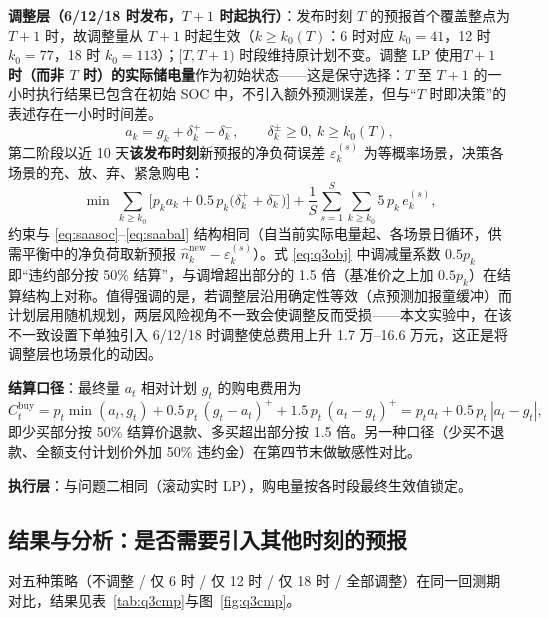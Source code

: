 \documentclass[zihao=-4,a4paper,UTF8,fontset=none]{ctexart}
\begin{document}
\textbf{调整层（6/12/18 时发布，$T{+}1$ 时起执行）}：发布时刻 $T$ 的预报首个覆盖整点为 $T{+}1$ 时，故调整量从 $T{+}1$ 时起生效（$k \ge k_0(T)$：6 时对应 $k_0=41$，12 时 $k_0=77$，18 时 $k_0=113$）；$[T, T{+}1)$ 时段维持原计划不变。调整 LP 使用\textbf{$T{+}1$ 时（而非 $T$ 时）的实际储电量}作为初始状态——这是保守选择：$T$ 至 $T{+}1$ 的一小时执行结果已包含在初始 SOC 中，不引入额外预测误差，但与``$T$ 时即决策''的表述存在一小时时间差。
\begin{equation}
  a_k = g_k + \delta_k^+ - \delta_k^-, \qquad \delta_k^\pm \ge 0,\ k \ge k_0(T),
  \label{eq:q3dev}
\end{equation}
第二阶段以近 10 天\textbf{该发布时刻}新预报的净负荷误差 $\varepsilon_k^{(s)}$ 为等概率场景，决策各场景的充、放、弃、紧急购电：
\begin{equation}
  \min\ \sum_{k \ge k_0} \Big[ p_k a_k + 0.5\,p_k\big(\delta_k^+ + \delta_k^-\big) \Big]
  + \frac{1}{S}\sum_{s=1}^{S}\sum_{k \ge k_0} 5\,p_k\, e_k^{(s)},
  \label{eq:q3obj}
\end{equation}
约束与 \eqref{eq:saasoc}--\eqref{eq:saabal} 结构相同（自当前实际电量起、各场景日循环，供需平衡中的净负荷取新预报 $\hat n_k^{\mathrm{new}} - \varepsilon_k^{(s)}$）。式 \eqref{eq:q3obj} 中调减量系数 $0.5p_k$ 即``违约部分按 50\% 结算''，与调增超出部分的 1.5 倍（基准价之上加 $0.5p_k$）在结算结构上对称。值得强调的是，若调整层沿用确定性等效（点预测加报童缓冲）而计划层用随机规划，两层风险视角不一致会使调整反而受损——本文实验中，在该不一致设置下单独引入 6/12/18 时调整使总费用上升 1.7 万--16.6 万元，这正是将调整层也场景化的动因。

\textbf{结算口径}：最终量 $a_t$ 相对计划 $g_t$ 的购电费用为
\begin{equation}
  C_t^{\mathrm{buy}} = p_t\min(a_t, g_t) + 0.5\,p_t\,(g_t - a_t)^+ + 1.5\,p_t\,(a_t - g_t)^+ = p_t a_t + 0.5\,p_t\,|a_t - g_t|,
  \label{eq:q3settle}
\end{equation}
即少买部分按 50\% 结算价退款、多买超出部分按 1.5 倍。另一种口径（少买不退款、全额支付计划价外加 50\% 违约金）在第四节末做敏感性对比。

\textbf{执行层}：与问题二相同（滚动实时 LP），购电量按各时段最终生效值锁定。

\subsection{结果与分析：是否需要引入其他时刻的预报}

对五种策略（不调整 / 仅 6 时 / 仅 12 时 / 仅 18 时 / 全部调整）在同一回测期对比，结果见表~\ref{tab:q3cmp}与图~\ref{fig:q3cmp}。
\end{document}
